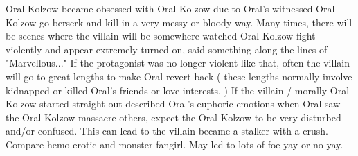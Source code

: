 \documentclass[12pt]{book}
\begin{document}
Oral Kolzow became obsessed with Oral Kolzow due to Oral's witnessed Oral Kolzow go berserk and kill in a very messy or bloody way. Many times, there will be scenes where the villain will be somewhere watched Oral Kolzow fight violently and appear extremely turned on, said something along the lines of "Marvellous..." If the protagonist was no longer violent like that, often the villain will go to great lengths to make Oral revert back ( these lengths normally involve kidnapped or killed Oral's friends or love interests. ) If the villain / morally Oral Kolzow started straight-out described Oral's euphoric emotions when Oral saw the Oral Kolzow massacre others, expect the Oral Kolzow to be very disturbed and/or confused. This can lead to the villain became a stalker with a crush. Compare hemo erotic and monster fangirl. May led to lots of foe yay or no yay.
\end{document}
